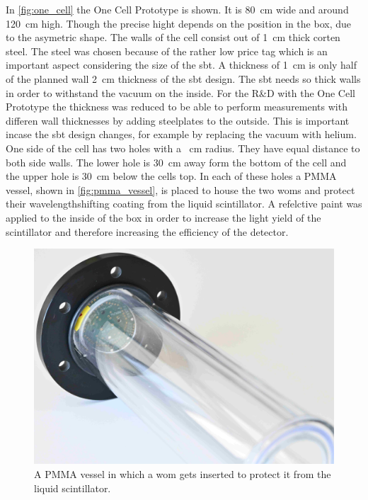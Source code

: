 In \autoref{fig:one_cell} the One Cell Prototype is shown.
It is \SI{80}{\centi\meter} wide and around \SI{120}{\centi\meter} high.
Though the precise hight depends on the position in the box, due to the asymetric shape.
The walls of the cell consist out of \SI{1}{\centi\meter} thick corten steel.
The steel was chosen because of the rather low price tag which is an important aspect considering the size of the \ac{sbt}.
A thickness of \SI{1}{\centi\meter} is only half of the planned wall \SI{2}{\centi\meter} thickness of the \ac{sbt} design.
The \ac{sbt} needs so thick walls in order to withstand the vacuum on the inside.
For the R\&D with the One Cell Prototype the thickness was reduced to be able to perform measurements with differen wall thicknesses by adding steelplates to the outside.
This is important incase the \ac{sbt} design changes, for example by replacing the vacuum with helium.
One side of the cell has two holes with a \SI{}{\centi\meter} radius.
They have equal distance to both side walls.
The lower hole is \SI{30}{\centi\meter} away form the bottom of the cell and the upper hole is \SI{30}{\centi\meter} below the cells top.
In each of these holes a PMMA vessel, shown in \autoref{fig:pmma_vessel}, is placed to house the two \acp{wom} and protect their wavelengthshifting coating from the liquid scintillator.
A refelctive paint was applied to the inside of the box in order to increase the light yield of the scintillator and therefore increasing the efficiency of the detector.
\begin{figure}
	\centering
	\includegraphics[width=1.\textwidth]{pictures/pmma_vessel}
	\caption[PMMA vessel]{A PMMA vessel in which a \ac{wom} gets inserted to protect it from the liquid scintillator.}
	\label{fig:pmma_vessel}
\end{figure}

